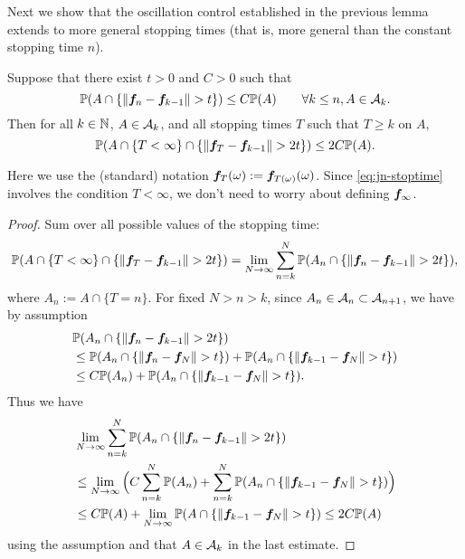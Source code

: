 Next we show that the oscillation control established in the previous lemma extends to more general stopping times (that is, more general than the constant stopping time $n$).

\begin{lem}\label{lem:st-extension}
  Suppose that there exist $t > 0$ and $C > 0$ such that
  \begin{equation*}
    \mathbb{P}(A \cap \{ \| \bm{f}_n - \bm{f}_{k-1} \| > t \} ) \leq C \mathbb{P}(A) \qquad \forall k \leq n, A \in \mathcal{A}_k.
  \end{equation*}
  Then for all $k \in \mathbb{N}$, $A \in \mathcal{A}_k$, and all stopping times $T$ such that $T \geq k$ on $A$,
  \begin{equation}\label{eq:jn-stoptime}
    \mathbb{P}(A \cap \{T < \infty\} \cap \{ \| \bm{f}_{T} - \bm{f}_{k-1} \| > 2t \} ) \leq 2C \mathbb{P}(A).
  \end{equation}
\end{lem}

Here we use the (standard) notation $\bm{f}_{T}(\omega) := \bm{f}_{T(\omega)}(\omega)$.
Since \eqref{eq:jn-stoptime} involves the condition $T < \infty$, we don't need to worry about defining $\bm{f}_{\infty}$.

\begin{proof}
  Sum over all possible values of the stopping time:
  \begin{equation*}
      \mathbb{P}(A \cap \{T < \infty\} \cap \{ \| \bm{f}_{T} - \bm{f}_{k-1} \| > 2t \} ) 
      = \lim_{N \to \infty} \sum_{n = k}^{N} \mathbb{P}(A_n \cap \{ \| \bm{f}_{n} - \bm{f}_{k-1} \| > 2t \} ),
  \end{equation*}
  where $A_{n} := A \cap \{T = n\}$.
  For fixed $N > n > k$, since $A_n \in \mathcal{A}_n \subset \mathcal{A}_{n+1}$, we have by assumption
  \begin{equation*}
    \begin{aligned}
      &\mathbb{P}(A_n \cap \{ \| \bm{f}_{n} - \bm{f}_{k-1} \| > 2t \} ) \\
      &\leq \mathbb{P}(A_n \cap \{ \| \bm{f}_{n} - \bm{f}_{N} \| > t \} )
      + \mathbb{P}(A_n \cap \{ \| \bm{f}_{k-1} - \bm{f}_{N} \| > t \} ) \\
      &\leq C \mathbb{P}(A_n) + \mathbb{P}(A_n \cap \{ \| \bm{f}_{k-1} - \bm{f}_{N} \| > t \} ).
    \end{aligned}
  \end{equation*}
  Thus we have
  \begin{equation*}
    \begin{aligned}
      &\lim_{N \to \infty} \sum_{n = k}^{N} \mathbb{P}(A_n \cap \{ \| \bm{f}_{n} - \bm{f}_{k-1} \| > 2t \} ) \\
      &\leq \lim_{N \to \infty} \Big( C \sum_{n=k}^N \mathbb{P}(A_n) + \sum_{n=k}^N \mathbb{P}(A_n \cap \{ \| \bm{f}_{k-1} - \bm{f}_{N} \| > t \}) \Big) \\
      &\leq C \mathbb{P}(A) + \lim_{N \to \infty} \mathbb{P}(A \cap \{ \| \bm{f}_{k-1} - \bm{f}_{N} \| > t \})  
      \leq 2C\mathbb{P}(A)
    \end{aligned}
  \end{equation*}
  using the assumption and that $A \in \mathcal{A}_k$ in the last estimate.
\end{proof}
  
